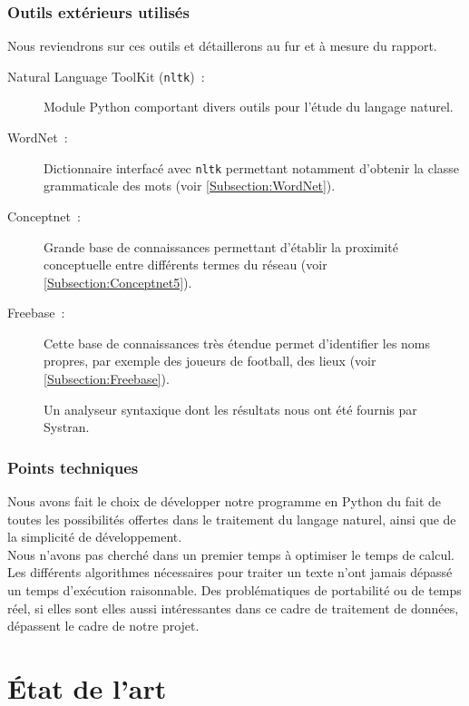 \documentclass[a4paper, 12pt]{article}
\newcommand{\pyt}[1]{\texttt{#1}}%
\begin{document}
\subsubsection{Outils extérieurs utilisés}

Nous reviendrons sur ces outils et détaillerons au fur et à mesure du rapport.

\begin{description}
	\item[Natural Language ToolKit (\pyt{nltk})~: ]Module Python comportant divers outils pour l'étude du langage naturel.
	\item[WordNet~: ]Dictionnaire interfacé avec \pyt{nltk} permettant notamment d'obtenir la classe grammaticale des mots (voir \ref{Subsection:WordNet}).
	\item[Conceptnet~: ]Grande base de connaissances permettant d'établir la proximité conceptuelle entre différents termes du réseau (voir \ref{Subsection:Conceptnet5}).
	\item[Freebase~: ]Cette base de connaissances très étendue permet d'identifier les noms propres, par exemple des joueurs de football, des lieux (voir \ref{Subsection:Freebase}).

	\item[] Un analyseur syntaxique dont les résultats nous ont été fournis par Systran.
\end{description}

\subsubsection{Points techniques}

Nous avons fait le choix de développer notre programme en Python du fait de toutes les possibilités offertes dans le traitement du langage naturel, ainsi que de la simplicité de développement.\\

Nous n'avons pas cherché dans un premier temps à optimiser le temps de calcul. Les différents algorithmes nécessaires pour traiter un texte n'ont jamais dépassé un temps d'exécution raisonnable. Des problématiques de portabilité ou de temps réel, si elles sont elles aussi intéressantes dans ce cadre de traitement de données, dépassent le cadre de notre projet.


\section{État de l'art} %
\end{document}
